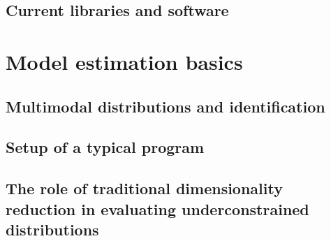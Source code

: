 \subsection{Current libraries and software}

\section{Model estimation basics}

\subsection{Multimodal distributions and identification}

\subsection{Setup of a typical program}

\subsection{The role of traditional dimensionality reduction in evaluating underconstrained distributions}
